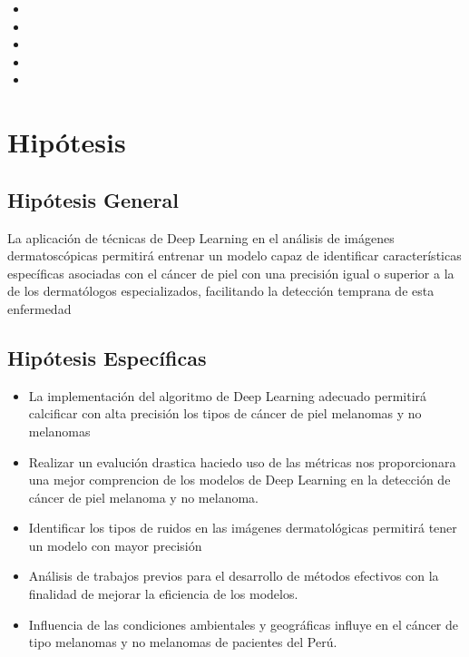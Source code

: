 \begin{itemize}
	\item {\Objone}
	\item {\Objtwo}
	\item {\Objthree}
	\item {\Objfour}
	\item {\Objfive}
\end{itemize}


\section{Hipótesis}

\subsection{Hipótesis General}
\newcommand{\HipotesisGeneral}{
La aplicación de técnicas de Deep Learning en el análisis de imágenes dermatoscópicas permitirá entrenar un modelo capaz de identificar características específicas asociadas con el cáncer de piel con una precisión igual o superior a la de los dermatólogos especializados, facilitando la detección temprana de esta enfermedad

}
\HipotesisGeneral
\subsection{Hipótesis Específicas}
\newcommand{\Hone}{
	La implementación del algoritmo de Deep Learning adecuado permitirá calcificar con alta precisión los tipos de cáncer de piel melanomas y no melanomas
	
}
\newcommand{\Htwo}{
Realizar un evalución drastica haciedo uso de las métricas nos proporcionara una mejor comprencion de los modelos de Deep Learning en la detección de cáncer de piel melanoma y no melanoma.
	
}
\newcommand{\Hthree}{
	Identificar los tipos de ruidos en las imágenes dermatológicas permitirá tener un modelo con mayor precisión
		
}
\newcommand{\Hfour}{
	Análisis de trabajos previos para el desarrollo de métodos efectivos con la finalidad de mejorar la eficiencia de los modelos.
	
}
\newcommand{\Hfive}{
	Influencia de las condiciones ambientales y geográficas influye en el cáncer de tipo melanomas y no melanomas de pacientes del Perú.
}
\begin{itemize}
	\item \Hone
	\item \Htwo
	\item \Hthree
	\item \Hfour
	\item \Hfive
\end{itemize}

